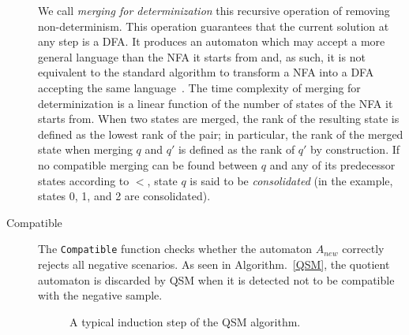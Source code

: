 \begin{description}
We call \textsl{merging for determinization} this recursive operation of removing non-determinism. This operation guarantees that the current solution at any step is a DFA. It produces an automaton which may accept a more general language than the NFA it starts from and, as such, it is not equivalent to the standard algorithm to transform a NFA into a DFA accepting the same language~\cite{Hopcroft:1979}. 
The time complexity of merging for determinization is a linear function of the number of states of the NFA it starts from. 
When two states are merged, the rank of the resulting state is defined as the lowest rank of the pair; in particular, the rank of the merged state when merging $q$ and $q'$ is defined as the rank of $q'$ by construction. If no compatible merging can be found between $q$ and any of its predecessor states according to $<$, state $q$ is said to be \textsl{consolidated} (in the example, states 0, 1, and 2 are consolidated).

\item[Compatible] The \texttt{Compatible} function checks whether the automaton $A_{new}$ correctly rejects all negative scenarios. As seen in Algorithm.~\ref{QSM}, the quotient automaton is discarded by \textsc{QSM} when it is detected not to be compatible with the negative sample.

\begin{figure}[H]
\hspace*{-1cm}
\begin{center}
\end{center}
\caption{A typical induction step of the \textsc{QSM} algorithm\label{Fig:algo:steps}.}
\end{figure}

\end{description}

